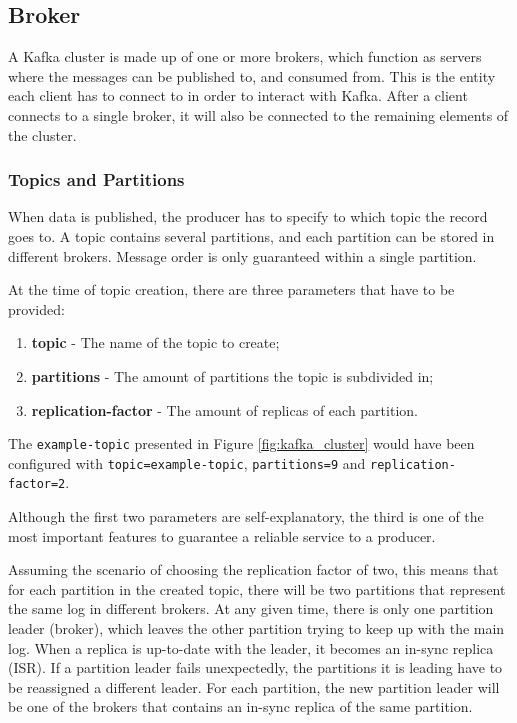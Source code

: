 \subsection{Broker}

A Kafka cluster is made up of one or more brokers, which function as servers
where the messages can be published to, and consumed from. This is the entity
each client has to connect to in order to interact with Kafka. After a client
connects to a single broker, it will also be connected to the remaining elements
of the cluster.

\subsubsection{Topics and Partitions}

When data is published, the producer has to specify to which topic the record
goes to. A topic contains several partitions, and each partition can be stored
in different brokers. Message order is only guaranteed within a single
partition.

At the time of topic creation, there are three parameters that have to be
provided: 
\begin{enumerate}
    \item \textbf{topic} - The name of the topic to create;
    \item \textbf{partitions} - The amount of partitions the topic is subdivided
        in;
    \item \textbf{replication-factor} - The amount of replicas of each partition.
\end{enumerate}
The \lstinline{example-topic} presented in Figure \ref{fig:kafka_cluster} would have been
configured with \lstinline{topic=example-topic}, \lstinline{partitions=9} and
\lstinline{replication-factor=2}.

Although the first two parameters are self-explanatory, the third is one of the
most important features to guarantee a reliable service to a producer. 

Assuming the scenario of choosing the replication factor of two, this means that
for each partition in the created topic, there will be two partitions that
represent the same log in different brokers. At any given time, there is only
one partition leader (broker), which leaves the other partition trying to keep
up with the main log. When a replica is up-to-date with the leader, it becomes
an in-sync replica (ISR). If a partition leader fails unexpectedly, the
partitions it is leading have to be reassigned a different leader. For each
partition, the new partition leader will be one of the brokers that contains an
in-sync replica of the same partition.


